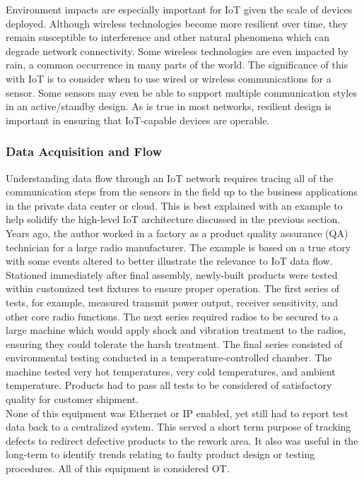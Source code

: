Environment impacts are especially important for IoT given the scale of
devices deployed. Although wireless technologies become more resilient over
time, they remain susceptible to interference and other natural phenomena
which can degrade network connectivity. Some wireless technologies are even
impacted by rain, a common occurrence in many parts of the world. The
significance of this with IoT is to consider when to use wired or wireless
communications for a sensor. Some sensors may even be able to support multiple
communication styles in an active/standby design. As is true in most networks,
resilient design is important in ensuring that IoT-capable devices are operable. \\

\subsubsection{Data Acquisition and Flow}
Understanding data flow through an IoT network requires tracing all of the
communication steps from the sensors in the field up to the business
applications in the private data center or cloud. This is best explained with
an example to help solidify the high-level IoT architecture discussed in the
previous section. \\

Years ago, the author worked in a factory as a product quality assurance (QA)
technician for a large radio manufacturer. The example is based on a true
story with some events altered to better illustrate the relevance to IoT data
flow. \\

Stationed immediately after final assembly, newly-built products were tested
within customized test fixtures to ensure proper operation. The first series
of tests, for example, measured transmit power output, receiver sensitivity,
and other core radio functions. The next series required radios to be secured
to a large machine which would apply shock and vibration treatment to the
radios, ensuring they could tolerate the harsh treatment. The final series
consisted of environmental testing conducted in a temperature-controlled
chamber. The machine tested very hot temperatures, very cold temperatures, and
ambient temperature. Products had to pass all tests to be considered of
satisfactory quality for customer shipment. \\

None of this equipment was Ethernet or IP enabled, yet still had to report
test data back to a centralized system. This served a short term purpose of
tracking defects to redirect defective products to the rework area. It also
was useful in the long-term to identify trends relating to faulty product
design or testing procedures. All of this equipment is considered OT. \\

